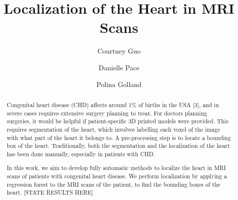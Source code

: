 \documentclass[sigconf,11pt]{acmart}
\begin{document}
\title{Localization of the Heart in MRI Scans}

\author{Courtney Guo}

\author{Danielle Pace}

\author{Polina Golland}

\begin{abstract}
Congenital heart disease (CHD) affects around 1\% of births in the USA [3], and in severe cases requires extensive surgery planning to treat. For doctors planning surgeries, it would be helpful if patient-specific 3D printed models were provided. This requires segmentation of the heart, which involves labelling each voxel of the image with what part of the heart it belongs to. A pre-processing step is to locate a bounding box of the heart. Traditionally, both the segmentation and the localization of the heart has been done manually, especially in patients with CHD.

In this work, we aim to develop fully automatic methods to localize the heart in MRI scans of patients with congenital heart disease. We perform localization by applying a regression forest to the MRI scans of the patient, to find the bounding boxes of the heart. [STATE RESULTS HERE]
\end{abstract}

\maketitle






\end{document}
